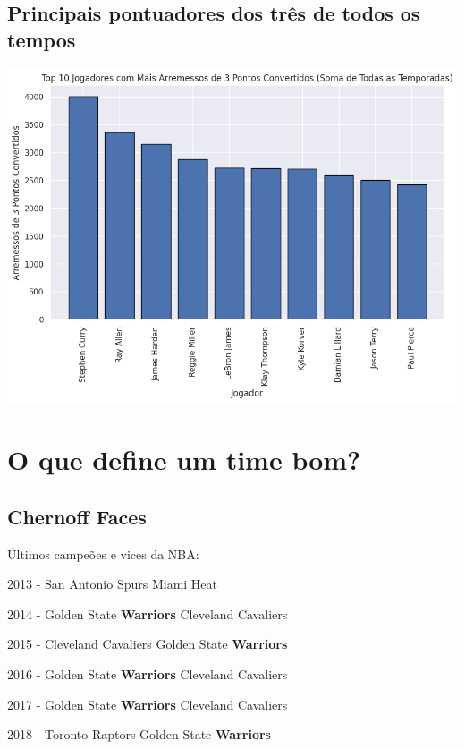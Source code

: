 \documentclass[
]{book}
\begin{document}
\hypertarget{principais-pontuadores-dos-truxeas-de-todos-os-tempos}{%
\section{Principais pontuadores dos três de todos os tempos}\label{principais-pontuadores-dos-truxeas-de-todos-os-tempos}}

\includegraphics{imagens/19.png}

\hypertarget{o-que-define-um-time-bom}{%
\chapter{O que define um time bom?}\label{o-que-define-um-time-bom}}

\hypertarget{chernoff-faces}{%
\section{Chernoff Faces}\label{chernoff-faces}}

Últimos campeões e vices da NBA:

2013 - San Antonio Spurs \textbar{} Miami Heat

2014 - Golden State \textbf{Warriors} \textbar{} Cleveland Cavaliers

2015 - Cleveland Cavaliers \textbar{} Golden State \textbf{Warriors}

2016 - Golden State \textbf{Warriors} \textbar{} Cleveland Cavaliers

2017 - Golden State \textbf{Warriors} \textbar{} Cleveland Cavaliers

2018 - Toronto Raptors \textbar{} Golden State \textbf{Warriors}
\end{document}

